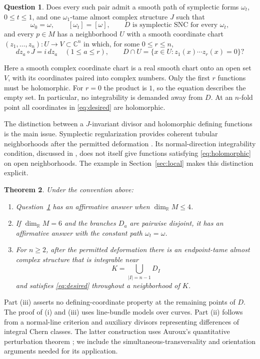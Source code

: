 \documentclass[11pt]{article}
\newtheorem{theorem}{Theorem}[section]
\theoremstyle{definition}
\newtheorem{question}[theorem]{Question}
\theoremstyle{remark}
\newcommand{\C}{\mathbb C}
\newcommand{\R}{\mathbb R}
\begin{document}

\begin{question}\label{q:main}
Does every such pair admit a smooth path of symplectic forms $\omega_t$, $0\leq t\leq1$, and one $\omega_1$-tame almost complex structure $J$ such that
\[
 \omega_0=\omega,\qquad [\omega_t]=[\omega],
 \qquad D\text{ is symplectic SNC for every }\omega_t,
\]
and every $p\in M$ has a neighborhood $U$ with a smooth coordinate chart $(z_1,\ldots,z_n):U\to V\subset\C^n$ in which, for some $0\leq r\leq n$,
\begin{equation}\label{eq:desired}
 dz_a\circ J=i\,dz_a\quad(1\leq a\leq r),
 \qquad D\cap U=\{x\in U:z_1(x)\cdots z_r(x)=0\}?
\end{equation}
\end{question}
Here a smooth complex coordinate chart is a real smooth chart onto an open set $V$, with its coordinates paired into complex numbers. Only the first $r$ functions must be holomorphic. For $r=0$ the product is $1$, so the equation describes the empty set. In particular, no integrability is demanded away from $D$. At an $n$-fold point all coordinates in \eqref{eq:desired} are holomorphic.

The distinction between a $J$-invariant divisor and holomorphic defining functions is the main issue. Symplectic regularization provides coherent tubular neighborhoods after the permitted deformation \cite[Theorem 2.13]{TMZ}. Its normal-direction integrability condition, discussed in \cite[Section 1.1]{TMZ}, does not itself give functions satisfying \eqref{eq:holomorphic} on open neighborhoods. The example in Section~\ref{sec:local} makes this distinction explicit.


\begin{theorem}\label{thm:partial}
Under the convention above:
\begin{enumerate}[label=(\roman*),leftmargin=*]
\item Question~\ref{q:main} has an affirmative answer when $\dim_\R M\leq4$.
\item If $\dim_\R M=6$ and the branches $D_a$ are pairwise disjoint, it has an affirmative answer with the constant path $\omega_t=\omega$.
\item For $n\geq2$, after the permitted deformation there is an endpoint-tame almost complex structure that is integrable near
\[
 K=\bigcup_{|I|=n-1}D_I
\]
and satisfies \eqref{eq:desired} throughout a neighborhood of $K$.
\end{enumerate}
\end{theorem}
Part (iii) asserts no defining-coordinate property at the remaining points of $D$. The proof of (i) and (iii) uses line-bundle models over curves. Part (ii) follows from a normal-line criterion and auxiliary divisors representing differences of integral Chern classes. The latter construction uses Auroux's quantitative perturbation theorem \cite[Theorem 2]{Auroux}; we include the simultaneous-transversality and orientation arguments needed for its application.
\end{document}
